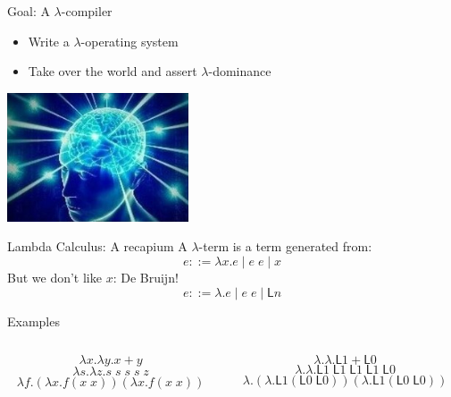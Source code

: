 \documentclass{beamer}
\renewcommand{\L}{\mathsf{L}}
\begin{document}
 \begin{frame}{Goal: A $\lambda$-compiler}
  \begin{itemize}
    \item Write a $\lambda$-operating system
    \item Take over the world and assert $\lambda$-dominance
  \end{itemize}
 \begin{center}
  \includegraphics[scale = 1.4]{brain4}
 \end{center}
 \end{frame}

  \begin{frame}{Lambda Calculus: A recapium}
 A $\lambda$-term is a term generated from:
 \[e ::= \lambda x . e \mid e \; e \mid x\]
But we don't like $x$: De Bruijn!
\[e ::= \lambda. e \mid e \; e \mid \L n\]

\begin{block}{Examples}

\end{block}

\begin{columns}
\begin{column}{0.5\textwidth}
 \[\lambda x . \lambda y . x + y\]
 \[ \lambda s. \lambda z. s\;s\;s\;s\;z \]
 \[\lambda f. (\lambda x . f(x\;x))(\lambda x . f(x\;x))\]
\end{column}

\begin{column}{0.5\textwidth}
 \[\lambda .\lambda . \L 1 + \L 0\]
 \[ \lambda. \lambda. \L 1 \; \L 1 \; \L 1 \; \L 1 \; \L 0 \]
  \[\lambda. (\lambda . \L1(\L0\;\L0))(\lambda . \L1(\L0\;\L0))\]
\end{column}
\end{columns}
 \end{frame}
\end{document}
